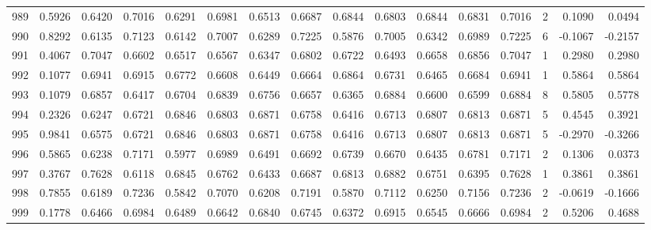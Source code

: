 \begin{tabular}{lrrrrrrrrrrrrrrr}
989 &      0.5926 &  0.6420 &  0.7016 &  0.6291 &  0.6981 &  0.6513 &  0.6687 &  0.6844 &  0.6803 &  0.6844 &   0.6831 &     0.7016 &      2 &                    0.1090 &                     0.0494 \\
990 &      0.8292 &  0.6135 &  0.7123 &  0.6142 &  0.7007 &  0.6289 &  0.7225 &  0.5876 &  0.7005 &  0.6342 &   0.6989 &     0.7225 &      6 &                   -0.1067 &                    -0.2157 \\
991 &      0.4067 &  0.7047 &  0.6602 &  0.6517 &  0.6567 &  0.6347 &  0.6802 &  0.6722 &  0.6493 &  0.6658 &   0.6856 &     0.7047 &      1 &                    0.2980 &                     0.2980 \\
992 &      0.1077 &  0.6941 &  0.6915 &  0.6772 &  0.6608 &  0.6449 &  0.6664 &  0.6864 &  0.6731 &  0.6465 &   0.6684 &     0.6941 &      1 &                    0.5864 &                     0.5864 \\
993 &      0.1079 &  0.6857 &  0.6417 &  0.6704 &  0.6839 &  0.6756 &  0.6657 &  0.6365 &  0.6884 &  0.6600 &   0.6599 &     0.6884 &      8 &                    0.5805 &                     0.5778 \\
994 &      0.2326 &  0.6247 &  0.6721 &  0.6846 &  0.6803 &  0.6871 &  0.6758 &  0.6416 &  0.6713 &  0.6807 &   0.6813 &     0.6871 &      5 &                    0.4545 &                     0.3921 \\
995 &      0.9841 &  0.6575 &  0.6721 &  0.6846 &  0.6803 &  0.6871 &  0.6758 &  0.6416 &  0.6713 &  0.6807 &   0.6813 &     0.6871 &      5 &                   -0.2970 &                    -0.3266 \\
996 &      0.5865 &  0.6238 &  0.7171 &  0.5977 &  0.6989 &  0.6491 &  0.6692 &  0.6739 &  0.6670 &  0.6435 &   0.6781 &     0.7171 &      2 &                    0.1306 &                     0.0373 \\
997 &      0.3767 &  0.7628 &  0.6118 &  0.6845 &  0.6762 &  0.6433 &  0.6687 &  0.6813 &  0.6882 &  0.6751 &   0.6395 &     0.7628 &      1 &                    0.3861 &                     0.3861 \\
998 &      0.7855 &  0.6189 &  0.7236 &  0.5842 &  0.7070 &  0.6208 &  0.7191 &  0.5870 &  0.7112 &  0.6250 &   0.7156 &     0.7236 &      2 &                   -0.0619 &                    -0.1666 \\
999 &      0.1778 &  0.6466 &  0.6984 &  0.6489 &  0.6642 &  0.6840 &  0.6745 &  0.6372 &  0.6915 &  0.6545 &   0.6666 &     0.6984 &      2 &                    0.5206 &                     0.4688 \\
\bottomrule
\end{tabular}
